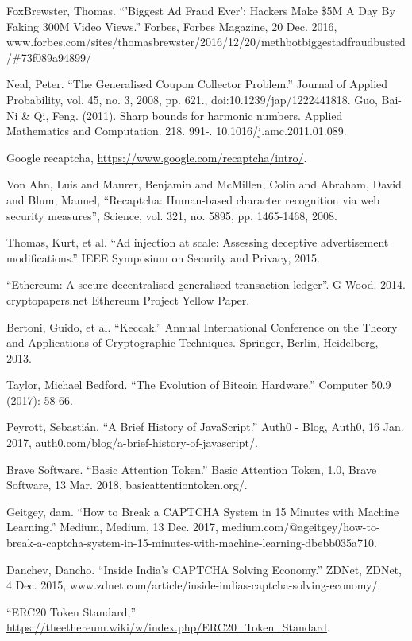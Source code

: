 \documentclass[runningheads]{llncs}
\begin{document}
\begin{thebibliography}{1}
 Fox\-Brewster, Thomas. ``'Biggest Ad Fraud Ever': Hackers Make \$5M A Day By Faking 300M Video Views.'' Forbes, Forbes Magazine, 20 Dec. 2016, www.forbes.com/sites/thomasbrewster/2016/12/20/methbot\-biggest\-ad\-fraud\-busted/\#73f089a94899/ 

 Neal, Peter. ``The Generalised Coupon Collector Problem.'' Journal of Applied Probability, vol. 45, no. 3, 2008, pp. 621., doi:10.1239/jap/1222441818.
 Guo, Bai-Ni \& Qi, Feng. (2011). Sharp bounds for harmonic numbers. Applied Mathematics and Computation. 218. 991-. 10.1016/j.amc.2011.01.089.

 Google recaptcha, \url{https://www.google.com/recaptcha/intro/}.

 Von Ahn, Luis and Maurer, Benjamin and McMillen, Colin and Abraham, David and Blum, Manuel, ``Recaptcha: Human-based character recognition via web security measures'', Science, vol. 321, no. 5895, pp. 1465-1468, 2008.

 Thomas, Kurt, et al. ``Ad injection at scale: Assessing deceptive advertisement modifications.'' IEEE Symposium on Security and Privacy, 2015.

 ``Ethereum: A secure decentralised generalised transaction ledger''. G Wood. 2014. cryptopapers.net Ethereum Project Yellow Paper.

 Bertoni, Guido, et al. ``Keccak.'' Annual International Conference on the Theory and Applications of Cryptographic Techniques. Springer, Berlin, Heidelberg, 2013.

 Taylor, Michael Bedford. ``The Evolution of Bitcoin Hardware.'' Computer 50.9 (2017): 58-66.

 Peyrott, Sebastián. ``A Brief History of JavaScript.'' Auth0 - Blog, Auth0, 16 Jan. 2017, auth0.com/blog/a-brief-history-of-javascript/. 

 Brave Software. ``Basic Attention Token.'' Basic Attention Token, 1.0, Brave Software, 13 Mar. 2018, basicattentiontoken.org/. 

 Geitgey, dam. ``How to Break a CAPTCHA System in 15 Minutes with Machine Learning.'' Medium, Medium, 13 Dec. 2017, medium.com/@ageitgey/how-to-break-a-captcha-system-in-15-minutes-with-machine-learning-dbebb035a710. 

 Danchev, Dancho. ``Inside India's CAPTCHA Solving Economy.'' ZDNet, ZDNet, 4 Dec. 2015, www.zdnet.com/article/inside-indias-captcha-solving-economy/.

 ``ERC20 Token Standard,'' \url{https://theethereum.wiki/w/index.php/ERC20\_Token\_Standard}.
\end{thebibliography}

\addtolength{\textheight}{-7cm}


\end{document}
